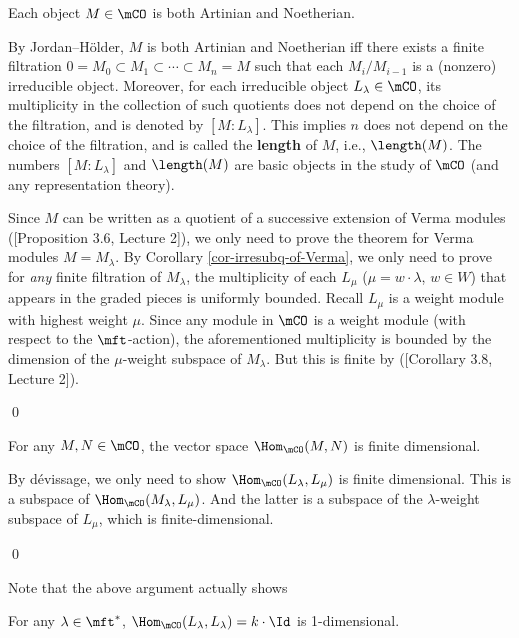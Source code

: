 	\begin{thm}
		Each object $M\in \mCO$ is both Artinian and Noetherian.
	\end{thm}

	\begin{rem}
		By Jordan--Hölder, $M$ is both Artinian and Noetherian iff there exists a finite filtration $0=M_0 \subset M_1 \subset\cdots\subset M_n=M$ such that each $M_i/M_{i-1}$ is a (nonzero) irreducible object. Moreover, for each irreducible object $L_\lambda \in \mCO$, its multiplicity in the collection of such quotients does not depend on the choice of the filtration, and is denoted by $[M: L_\lambda]$. This implies $n$ does not depend on the choice of the filtration, and is called the \textbf{length} of $M$, i.e., $\length(M)$. The numbers $[M: L_\lambda]$ and $\length(M)$ are basic objects in the study of $\mCO$ (and any representation theory).

	\end{rem}

	\proof
		Since $M$ can be written as a quotient of a successive extension of Verma modules ([Proposition 3.6, Lecture 2]), we only need to prove the theorem for Verma modules $M=M_\lambda$. By Corollary \ref{cor-irresubq-of-Verma}, we only need to prove for \emph{any} finite filtration of $M_\lambda$, the multiplicity of each $L_\mu$ ($\mu=w\cdot \lambda$, $w\in W$) that appears in the graded pieces is uniformly bounded. Recall $L_\mu$ is a weight module with highest weight $\mu$. Since any module in $\mCO$ is a weight module (with respect to the $\mft$-action), the aforementioned multiplicity is bounded by the dimension of the $\mu$-weight subspace of $M_\lambda$. But this is finite by ([Corollary 3.8, Lecture 2]).

	\qed

	\begin{prop}
		For any $M, N\in \mCO$, the vector space $\Hom_\mCO(M,N)$ is finite dimensional.
	\end{prop}

	\proof
		By dévissage, we only need to show $\Hom_\mCO(L_\lambda,L_\mu)$ is finite dimensional. This is a subspace of $\Hom_\mCO(M_\lambda,L_\mu)$. And the latter is a subspace of the $\lambda$-weight subspace of $L_\mu$, which is finite-dimensional.

	\qed

	Note that the above argument actually shows

	\begin{lem}
		For any $\lambda \in \mft^*$, $\Hom_\mCO(L_\lambda,L_\lambda) = k\cdot \Id$ is 1-dimensional.
	\end{lem}

